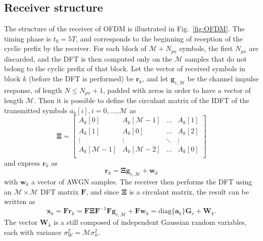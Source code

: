 \documentclass[10pt]{article}
\newcommand{\ofdM} {\mathcal{M}}
\newcommand{\DFTmat} {\mathbf{F}}
\begin{document}
\subsection*{Receiver structure}
The structure of the receiver of OFDM is illustrated in Fig.~\ref{fig:OFDM}. The timing phase is $t_0 = 5 T$, and corresponds to the beginning of reception of the cyclic prefix by the receiver. For each block of $\ofdM + N_{px}$ symbols, the first $N_{px}$ are discarded, and the DFT is then computed only on the $\ofdM$ samples that do not belong to the cyclic prefix of that block. Let the vector of received symbols in block $k$ (before the DFT is performed) be $\mathbf{r}_k$, and let $\mathbf{g}_{c,\ofdM}$ be the channel impulse response, of length $N \le N_{px} + 1$, padded with zeros in order to have a vector of length $\ofdM$. Then it is possible to define the circulant matrix of the IDFT of the transmitted symbols $a_k[i], i = 0, \dots, \ofdM$ as
\begin{equation}
	\boldsymbol{\Xi} = 
	\begin{bmatrix}
		A_k[0] & A_k[\ofdM - 1] & \dots & A_k[1] \\
		A_k[1] & A_k[0] & \dots & A_k[2] \\
		\vdots & \vdots & \ddots & \vdots \\
		A_k[\ofdM - 1] & A_k[\ofdM - 2] & \dots & A_k[0] \\
	\end{bmatrix}
\end{equation}
and express $\mathbf{r}_k$ as
\begin{equation}
	\mathbf{r}_k = \boldsymbol{\Xi} \mathbf{g}_{c,\ofdM} + \mathbf{w}_k
\end{equation}
with $\mathbf{w}_k$ a vector of AWGN samples. %
The receiver then performs the DFT using an $\ofdM \times \ofdM$ DFT matrix $\DFTmat$, and since $\boldsymbol{\Xi}$ is a circulant matrix, the result can be written as
\begin{equation}
	 \mathbf{x}_k = \DFTmat \mathbf{r}_k = \DFTmat \boldsymbol{\Xi} \DFTmat^{-1} \DFTmat \mathbf{g}_{c,\ofdM} + \DFTmat \mathbf{w}_k = \mathrm{diag}\{\mathbf{a}_k\} \mathbf{G}_c + \mathbf{W}_k.
\end{equation}
The vector $\mathbf{W}_k$ is a still composed of independent Gaussian random variables, each with variance $\sigma_W^2 = \ofdM \sigma_w^2$. 
\end{document}
